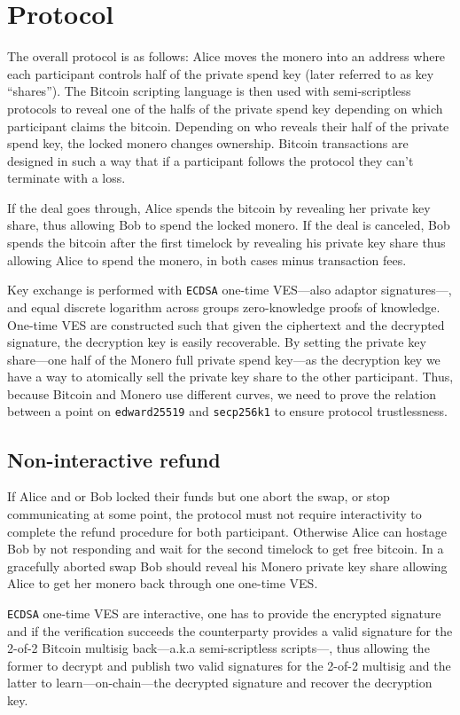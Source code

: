 \documentclass{llncs}
\begin{document}
\section{Protocol}
The overall protocol is as follows: Alice moves the monero into an address where each participant controls half of the private spend key (later referred to as key ``shares''). The Bitcoin scripting language is then used with semi-scriptless protocols to reveal one of the halfs of the private spend key depending on which participant claims the bitcoin. Depending on who reveals their half of the private spend key, the locked monero changes ownership. Bitcoin transactions are designed in such a way
that if a participant follows the protocol they can't terminate with a loss.

If the deal goes through, Alice spends the bitcoin by revealing her private key share, thus allowing Bob to spend the locked monero. If the deal is canceled, Bob spends the bitcoin after the first timelock by revealing his private key share thus allowing Alice to spend the monero, in both cases minus transaction fees.

Key exchange is performed with \texttt{ECDSA} one-time VES---also adaptor signatures---, and equal discrete logarithm across groups zero-knowledge proofs of knowledge. One-time VES are constructed such that given the ciphertext and the decrypted signature, the decryption key is easily recoverable.
By setting the private key share---one half of the Monero full private spend key---as the decryption key we have a way to atomically sell the private key share to the other participant. Thus, because Bitcoin and Monero use different curves, we need to prove the relation between a point on \texttt{edward25519} and \texttt{secp256k1} to ensure protocol trustlessness.

\subsection{Non-interactive refund}
If Alice and or Bob locked their funds but one abort the swap, or stop communicating at some point, the protocol must not require interactivity to complete the refund procedure for both participant. Otherwise Alice can hostage Bob by not responding and wait for the second timelock to get free bitcoin. In a gracefully aborted swap Bob should reveal his Monero private key share allowing Alice to get her monero back through one one-time VES.

\texttt{ECDSA} one-time VES are interactive, one has to provide the encrypted signature and if the verification succeeds the counterparty provides a valid signature for the 2-of-2 Bitcoin multisig back---a.k.a semi-scriptless scripts---, thus allowing the former to decrypt and publish two valid signatures for the 2-of-2 multisig and the latter to learn---on-chain---the decrypted signature and recover the decryption key.
\end{document}
